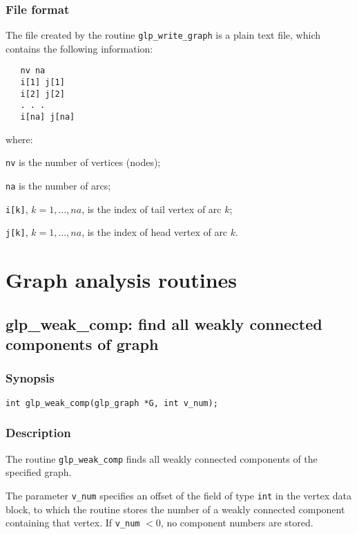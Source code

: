 \subsubsection*{File format}

The file created by the routine \verb|glp_write_graph| is a plain text
file, which contains the following information:

\begin{verbatim}
   nv na
   i[1] j[1]
   i[2] j[2]
   . . .
   i[na] j[na]
\end{verbatim}

\noindent
where:

\noindent
\verb|nv| is the number of vertices (nodes);

\noindent
\verb|na| is the number of arcs;

\noindent
\verb|i[k]|, $k=1,\dots,na$, is the index of tail vertex of arc $k$;

\noindent
\verb|j[k]|, $k=1,\dots,na$, is the index of head vertex of arc $k$.

\newpage

\section{Graph analysis routines}

\subsection{glp\_weak\_comp: find all weakly connected components of
graph}

\subsubsection*{Synopsis}

\begin{verbatim}
int glp_weak_comp(glp_graph *G, int v_num);
\end{verbatim}

\subsubsection*{Description}

The routine \verb|glp_weak_comp| finds all weakly connected components
of the specified graph.

The parameter \verb|v_num| specifies an offset of the field of type
\verb|int| in the vertex data block, to which the routine stores the
number of a weakly connected component containing that vertex. If
\verb|v_num| $<0$, no component numbers are stored.

